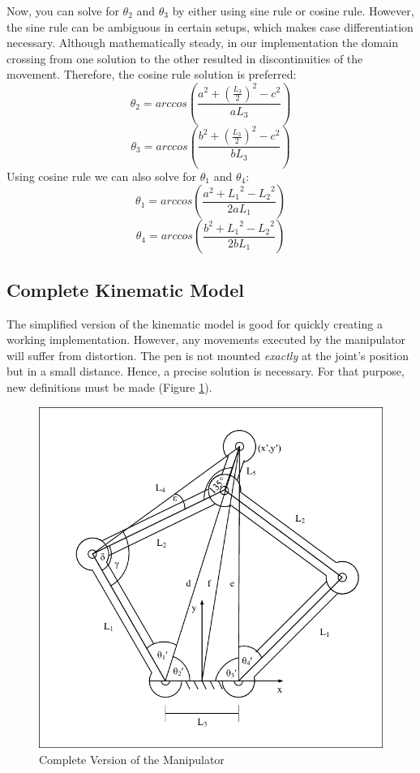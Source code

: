 \documentclass{sig-alternate-05-2015}
\begin{document}
Now, you can solve for $\theta_2$ and $\theta_3$ by either using sine rule or cosine rule. However, the sine rule can be ambiguous in certain setups, which makes case differentiation necessary. Although mathematically steady, in our implementation the domain crossing from one solution to the other resulted in discontinuities of the movement. Therefore, the cosine rule solution is preferred:
\begin{equation}
\theta_2 = arccos\left(  \frac{a^2 + (\frac{L_3}{2})^2 - c^2}{aL_3} \right)
\label{eqn:theta2}
\end{equation}
\begin{equation}
\theta_3 = arccos\left(  \frac{b^2 + (\frac{L_3}{2})^2 - c^2}{bL_3} \right)
\label{eqn:theta3}
\end{equation}
Using cosine rule we can also solve for $\theta_1$ and $\theta_4$:
\begin{equation}
\theta_1 = arccos\left(  \frac{a^2 + {L_1}^2 - {L_2}^2}{2aL_1} \right)
\label{eqn:theta1}
\end{equation}
\begin{equation}
\theta_4 = arccos\left(  \frac{b^2 + {L_1}^2 - {L_2}^2}{2bL_1} \right)
\label{eqn:theta4}
\end{equation}

\subsection{Complete Kinematic Model}
The simplified version of the kinematic model is good for quickly creating a working implementation. However, any movements executed by the manipulator will suffer from distortion. The pen is not mounted \emph{exactly} at the joint's position but in a small distance. Hence, a precise solution is necessary. For that purpose, new definitions must be made (Figure \ref{fig:model2}).
\begin{figure}[!h]
	\label{fig:model2}
	\centering
	\includegraphics[width=.42\textwidth]{LinkDiagramComplicated_try.pdf}
	\caption{Complete Version of the Manipulator}
\end{figure}
\end{document}

